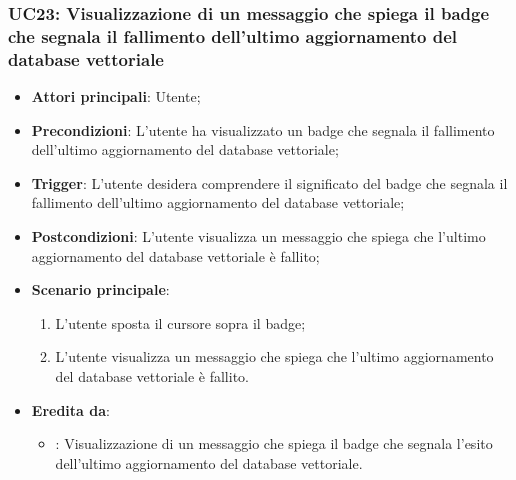 \subsubsection{UC23: Visualizzazione di un messaggio che spiega il badge che segnala il fallimento dell'ultimo aggiornamento del database vettoriale}
\begin{itemize}
    \item \textbf{Attori principali}: Utente;
    \item \textbf{Precondizioni}: L'utente ha visualizzato un badge che segnala il fallimento dell'ultimo aggiornamento del database vettoriale;
    \item \textbf{Trigger}: L'utente desidera comprendere il significato del badge che segnala il fallimento dell'ultimo aggiornamento del database vettoriale;
    \item \textbf{Postcondizioni}: L'utente visualizza un messaggio che spiega che l'ultimo aggiornamento del database vettoriale è fallito;
    \item \textbf{Scenario principale}:
    \begin{enumerate}
        \item L'utente sposta il cursore sopra il badge;
        \item L'utente visualizza un messaggio che spiega che l'ultimo aggiornamento del database vettoriale è fallito.
    \end{enumerate}
    \item \textbf{Eredita da}:
    \begin{itemize}
        \item {}: Visualizzazione di un messaggio che spiega il badge che segnala l'esito dell'ultimo aggiornamento del database vettoriale.
    \end{itemize}
\end{itemize}

\hypertarget{UC24}{}
